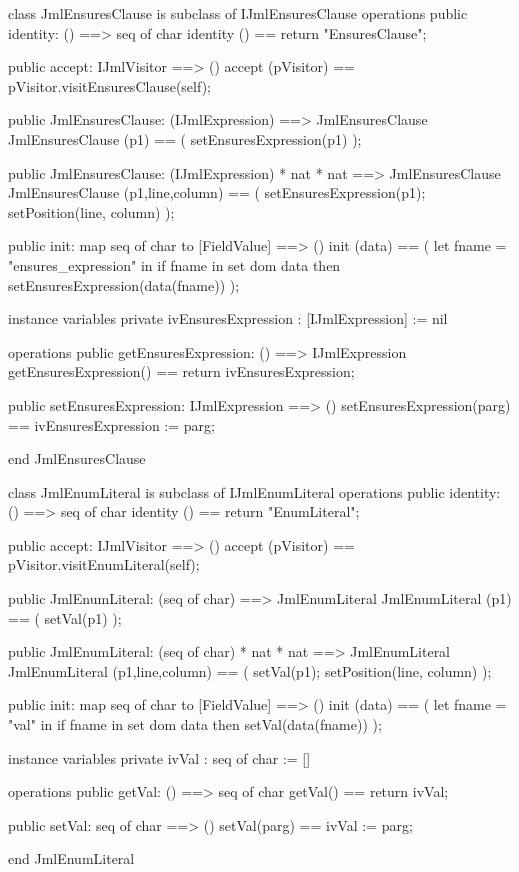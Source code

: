 \begin{vdm_al}
class JmlEnsuresClause is subclass of IJmlEnsuresClause
operations
  public identity: () ==> seq of char
  identity () == return "EnsuresClause";

  public accept: IJmlVisitor ==> ()
  accept (pVisitor) == pVisitor.visitEnsuresClause(self);

  public JmlEnsuresClause:
    (IJmlExpression) ==> JmlEnsuresClause
  JmlEnsuresClause (p1) == 
    ( setEnsuresExpression(p1) );

  public JmlEnsuresClause:
    (IJmlExpression) *
    nat *
    nat ==> JmlEnsuresClause
  JmlEnsuresClause (p1,line,column) == 
    ( setEnsuresExpression(p1);
      setPosition(line, column) );

  public init: map seq of char to [FieldValue] ==> ()
  init (data) ==
    ( let fname = "ensures_expression" in
        if fname in set dom data
        then setEnsuresExpression(data(fname)) );

instance variables
  private ivEnsuresExpression : [IJmlExpression] := nil

operations
  public getEnsuresExpression: () ==> IJmlExpression
  getEnsuresExpression() == return ivEnsuresExpression;

  public setEnsuresExpression: IJmlExpression ==> ()
  setEnsuresExpression(parg) == ivEnsuresExpression := parg;

end JmlEnsuresClause
\end{vdm_al}

\begin{vdm_al}
class JmlEnumLiteral is subclass of IJmlEnumLiteral
operations
  public identity: () ==> seq of char
  identity () == return "EnumLiteral";

  public accept: IJmlVisitor ==> ()
  accept (pVisitor) == pVisitor.visitEnumLiteral(self);

  public JmlEnumLiteral:
    (seq of char) ==> JmlEnumLiteral
  JmlEnumLiteral (p1) == 
    ( setVal(p1) );

  public JmlEnumLiteral:
    (seq of char) *
    nat *
    nat ==> JmlEnumLiteral
  JmlEnumLiteral (p1,line,column) == 
    ( setVal(p1);
      setPosition(line, column) );

  public init: map seq of char to [FieldValue] ==> ()
  init (data) ==
    ( let fname = "val" in
        if fname in set dom data
        then setVal(data(fname)) );

instance variables
  private ivVal : seq of char := []

operations
  public getVal: () ==> seq of char
  getVal() == return ivVal;

  public setVal: seq of char ==> ()
  setVal(parg) == ivVal := parg;

end JmlEnumLiteral
\end{vdm_al}

